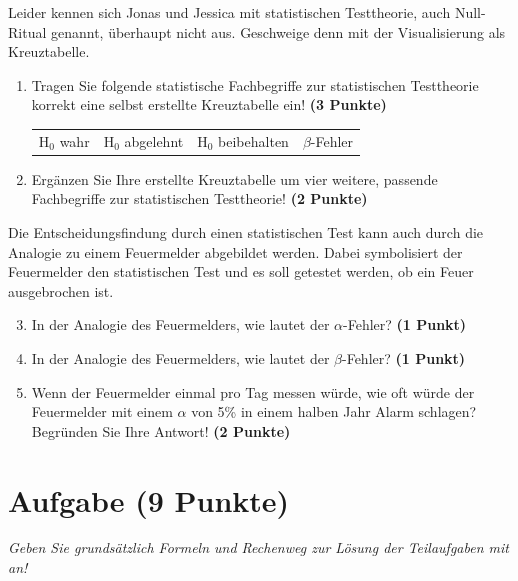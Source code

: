 \documentclass[a4paper, 9pt]{scrartcl}\usepackage[]{graphicx}\usepackage[]{xcolor}
\begin{document}
\vspace{1ex}

Leider kennen sich Jonas und Jessica mit statistischen Testtheorie, auch Null-Ritual genannt, überhaupt nicht aus. Geschweige denn mit der Visualisierung als Kreuztabelle.  

\begin{enumerate}
\item Tragen Sie folgende statistische Fachbegriffe zur statistischen Testtheorie korrekt eine selbst erstellte Kreuztabelle ein! \textbf{(3 Punkte)}
  \begin{center}
  \begin{tabular}{cccc}
  H$_0$ wahr & H$_0$ abgelehnt & H$_0$ beibehalten & $\beta$-Fehler \\
  \end{tabular}
  \end{center}
\item Ergänzen Sie Ihre erstellte Kreuztabelle um vier weitere, passende Fachbegriffe zur statistischen Testtheorie! \textbf{(2 Punkte)}
\end{enumerate}

Die Entscheidungsfindung durch einen statistischen Test kann auch durch die Analogie zu einem Feuermelder abgebildet werden. Dabei symbolisiert der Feuermelder den statistischen Test und es soll getestet werden, ob ein Feuer ausgebrochen ist.

\begin{enumerate}
  \setcounter{enumi}{2}    
\item In der Analogie des Feuermelders, wie lautet der $\alpha$-Fehler? \textbf{(1 Punkt)}
\item In der Analogie des Feuermelders, wie lautet der $\beta$-Fehler? \textbf{(1 Punkt)}
\item Wenn der Feuermelder einmal pro Tag messen würde, wie oft würde der Feuermelder mit einem $\alpha$ von 5\% in einem halben Jahr Alarm schlagen? Begründen Sie Ihre Antwort! \textbf{(2 Punkte)}
\end{enumerate}



 
\clearpage

\section{Aufgabe \hfill (9 Punkte)}

\textit{Geben Sie grundsätzlich Formeln und Rechenweg zur Lösung der Teilaufgaben mit an!} \\[1Ex]
\end{document}
